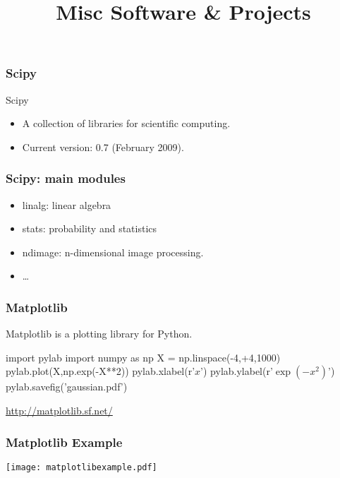 
\title{Misc Software \& Projects}

\frame{\maketitle}

\begin{frame}[fragile]
\frametitle{Scipy}

\begin{block}{Scipy}
\begin{itemize}
\item A collection of libraries for scientific computing.
\item Current version: 0.7 (February 2009).
\end{itemize}
\end{block}

\end{frame}

\begin{frame}[fragile]
\frametitle{Scipy: main modules}

\begin{itemize}
\item linalg: linear algebra
\item stats: probability and statistics
\item ndimage: n-dimensional image processing.
\item \ldots
\end{itemize}
\end{frame}

\begin{frame}[fragile]
\frametitle{Matplotlib}
Matplotlib is a \alert{plotting library} for Python.

\begin{python}
import pylab
import numpy as np
X = np.linspace(-4,+4,1000)
pylab.plot(X,np.exp(-X**2))
pylab.xlabel(r'$x$')
pylab.ylabel(r'$\exp(-x^{2})$')
pylab.savefig('gaussian.pdf')
\end{python}

\centering
\href{http://matplotlib.sf.net/}{http://matplotlib.sf.net/}

\end{frame}

\begin{frame}[fragile]
\frametitle{Matplotlib Example}

\centering
\texttt{[image: matplotlibexample.pdf]}

\end{frame}

